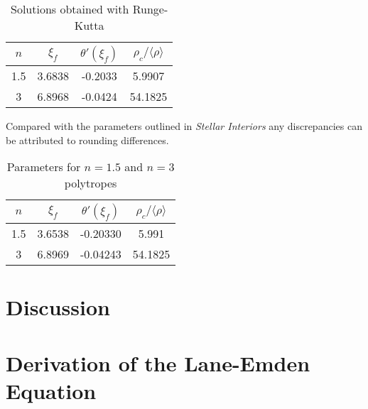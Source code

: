 \documentclass[twoside]{article}
\begin{document}
\begin{multicols}{2}
\begin{table}[H]
\caption{Solutions obtained with Runge-Kutta}
\centering
\begin{tabular}{c | c c c}
\toprule
\(n\) & \(\xi_f\) & \(\theta'(\xi_f)\) & \(\rho_c/\langle \rho \rangle\) \\
\midrule
1.5 & 3.6838 & -0.2033 & 5.9907 \\
3 & 6.8968 & -0.0424 & 54.1825 \\
\bottomrule
\end{tabular}
\end{table}


Compared with the parameters outlined in \textit{Stellar
Interiors}\cite{hansen2004} any discrepancies can be attributed to rounding
differences.

\begin{table}[H]
\caption{Parameters for \(n=1.5\) and \(n=3\) polytropes\cite[p.340]{hansen2004}}
\centering
\begin{tabular}{c | c c c}
\toprule
\(n\) & \(\xi_f\) & \(\theta'(\xi_f)\) & \(\rho_c/\langle \rho \rangle\) \\
\midrule
1.5 & 3.6538 & -0.20330 & 5.991 \\
3 & 6.8969 & -0.04243 & 54.1825 \\
\bottomrule
\end{tabular}
\end{table}


\section{Discussion}

\end{multicols}



\appendix
\appendixpage
\section{Derivation of the Lane-Emden Equation\cite[pp.176--179]{leblanc2010}} 
\end{document}
